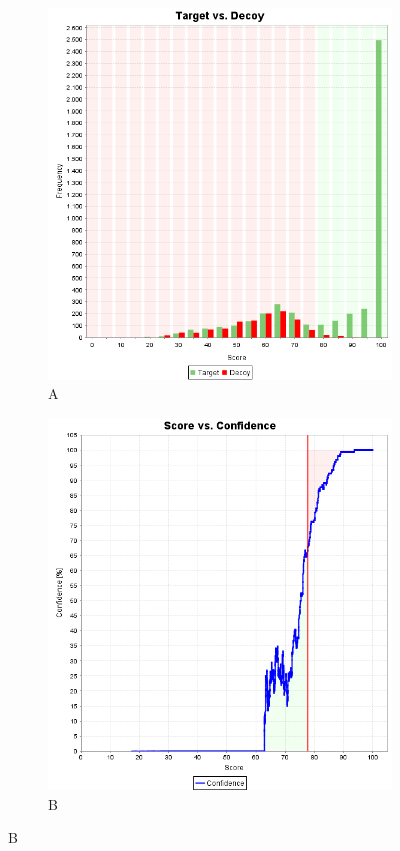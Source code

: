 \documentclass[11pt, a4paper]{report}
\begin{document}
\begin{figure}[!h]
\centering
\begin{subfigure}{.45\textwidth}
  \centering
  \caption*{A}
  \includegraphics[width=.9\linewidth]{target_vs_decoy}
\end{subfigure}
\begin{subfigure}{.45\textwidth}
  \centering
    \caption*{B}
  \includegraphics[width=.9\linewidth]{score_vs_confidence}
\end{subfigure}
\bigskip


\end{figure}
\end{document}
